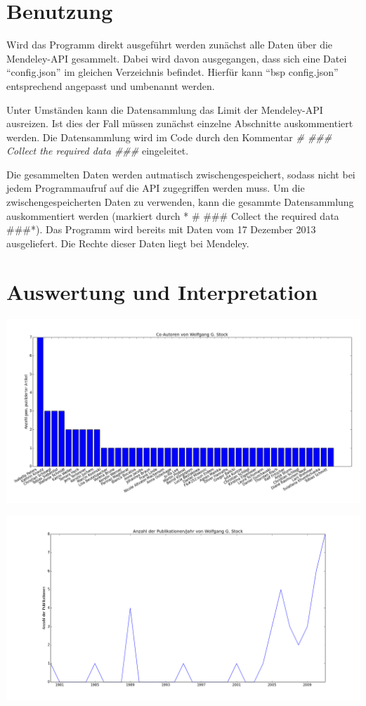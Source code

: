 \documentclass[letterpaper,10pt,english]{sphinxmanual}
\begin{document}
\section{Benutzung}
\label{project_3:benutzung}
Wird das Programm direkt ausgeführt werden zunächst alle Daten über die Mendeley-API gesammelt. Dabei wird davon ausgegangen, dass sich eine Datei ``config.json'' im gleichen Verzeichnis befindet. Hierfür kann ``bsp config.json'' entsprechend angepasst und umbenannt werden.

Unter Umständen kann die Datensammlung das Limit der Mendeley-API ausreizen. Ist dies der Fall müssen zunächst einzelne Abschnitte auskommentiert werden. Die Datensammlung wird im Code durch den Kommentar \emph{\# \#\#\# Collect the required data \#\#\#} eingeleitet.

Die gesammelten Daten werden autmatisch zwischengespeichert, sodass nicht bei jedem Programmaufruf auf die API zugegriffen werden muss. Um die zwischengespeicherten Daten zu verwenden, kann die gesammte Datensammlung auskommentiert werden (markiert durch * \# \#\#\# Collect the required data \#\#\#*).
Das Programm wird bereits mit Daten vom 17 Dezember 2013 ausgeliefert. Die Rechte dieser Daten liegt bei Mendeley.


\section{Auswertung und Interpretation}
\label{project_3:auswertung-und-interpretation}
\includegraphics{Stock_Co-Authors.png}

\includegraphics{Stock_publications_timeline.png}
\end{document}
